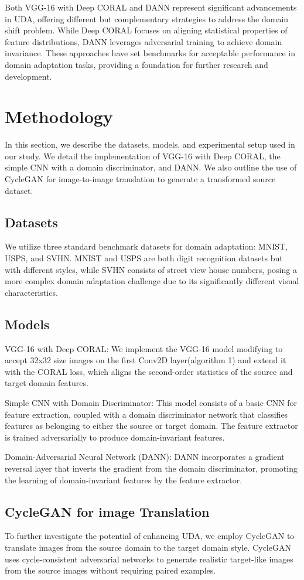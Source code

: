 \documentclass[conference]{IEEEtran}
\begin{document}
Both VGG-16 with Deep CORAL and DANN represent significant advancements in UDA, offering different but complementary strategies to address the domain shift problem. While Deep CORAL focuses on aligning statistical properties of feature distributions, DANN leverages adversarial training to achieve domain invariance. These approaches have set benchmarks for acceptable performance in domain adaptation tasks, providing a foundation for further research and development.

\section{Methodology}
In this section, we describe the datasets, models, and experimental setup used in our study. We detail the implementation of VGG-16 with Deep CORAL, the simple CNN with a domain discriminator, and DANN. We also outline the use of CycleGAN for image-to-image translation to generate a transformed source dataset.
\subsection{Datasets}
We utilize three standard benchmark datasets for domain adaptation: MNIST, USPS, and SVHN. MNIST and USPS are both digit recognition datasets but with different styles, while SVHN consists of street view house numbers, posing a more complex domain adaptation challenge due to its significantly different visual characteristics.
\subsection{Models}
VGG-16 with Deep CORAL: We implement the VGG-16 model modifying to accept 32x32 size images on the first Conv2D layer(algorithm 1) and extend it with the CORAL loss, which aligns the second-order statistics of the source and target domain features. 

Simple CNN with Domain Discriminator: This model consists of a basic CNN for feature extraction, coupled with a domain discriminator network that classifies features as belonging to either the source or target domain. The feature extractor is trained adversarially to produce domain-invariant features.

Domain-Adversarial Neural Network (DANN): DANN incorporates a gradient reversal layer that inverts the gradient from the domain discriminator, promoting the learning of domain-invariant features by the feature extractor.

\subsection{CycleGAN for image Translation}
To further investigate the potential of enhancing UDA, we employ CycleGAN to translate images from the source domain to the target domain style. CycleGAN uses cycle-consistent adversarial networks to generate realistic target-like images from the source images without requiring paired examples.
\end{document}

